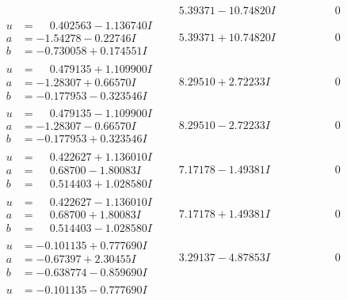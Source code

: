 \documentclass[1p]{elsarticle_modified}
\theoremstyle{definition}
\begin{document}
$$\begin{array}{c|c|c}
 & \phantom{-}5.39371 - 10.74820 I & \phantom{-0.000000 } 0 \\ \hline\begin{aligned}
u &= \phantom{-}0.402563 - 1.136740 I \\
a &= -1.54278 - 0.22746 I \\
b &= -0.730058 + 0.174551 I\end{aligned}
 & \phantom{-}5.39371 + 10.74820 I & \phantom{-0.000000 } 0 \\ \hline\begin{aligned}
u &= \phantom{-}0.479135 + 1.109900 I \\
a &= -1.28307 + 0.66570 I \\
b &= -0.177953 - 0.323546 I\end{aligned}
 & \phantom{-}8.29510 + 2.72233 I & \phantom{-0.000000 } 0 \\ \hline\begin{aligned}
u &= \phantom{-}0.479135 - 1.109900 I \\
a &= -1.28307 - 0.66570 I \\
b &= -0.177953 + 0.323546 I\end{aligned}
 & \phantom{-}8.29510 - 2.72233 I & \phantom{-0.000000 } 0 \\ \hline\begin{aligned}
u &= \phantom{-}0.422627 + 1.136010 I \\
a &= \phantom{-}0.68700 - 1.80083 I \\
b &= \phantom{-}0.514403 + 1.028580 I\end{aligned}
 & \phantom{-}7.17178 - 1.49381 I & \phantom{-0.000000 } 0 \\ \hline\begin{aligned}
u &= \phantom{-}0.422627 - 1.136010 I \\
a &= \phantom{-}0.68700 + 1.80083 I \\
b &= \phantom{-}0.514403 - 1.028580 I\end{aligned}
 & \phantom{-}7.17178 + 1.49381 I & \phantom{-0.000000 } 0 \\ \hline\begin{aligned}
u &= -0.101135 + 0.777690 I \\
a &= -0.67397 + 2.30455 I \\
b &= -0.638774 - 0.859690 I\end{aligned}
 & \phantom{-}3.29137 - 4.87853 I & \phantom{-0.000000 } 0 \\ \hline\begin{aligned}
u &= -0.101135 - 0.777690 I \\

\end{aligned}
\end{array}$$
\end{document}
